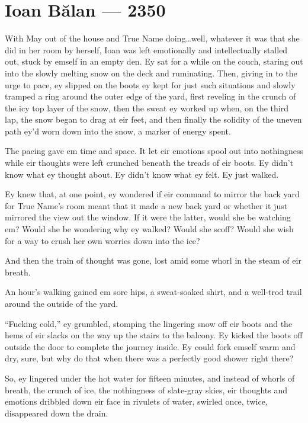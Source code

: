\hypertarget{ioan-bux103lan-2350}{%
\chapter{Ioan Bălan — 2350}\label{ioan-bux103lan-2350}}

With May out of the house and True Name doing\ldots well, whatever it was that she did in her room by herself, Ioan was left emotionally and intellectually stalled out, stuck by emself in an empty den. Ey sat for a while on the couch, staring out into the slowly melting snow on the deck and ruminating. Then, giving in to the urge to pace, ey slipped on the boots ey kept for just such situations and slowly tramped a ring around the outer edge of the yard, first reveling in the crunch of the icy top layer of the snow, then the sweat ey worked up when, on the third lap, the snow began to drag at eir feet, and then finally the solidity of the uneven path ey'd worn down into the snow, a marker of energy spent.

The pacing gave em time and space. It let eir emotions spool out into nothingness while eir thoughts were left crunched beneath the treads of eir boots. Ey didn't know what ey thought about. Ey didn't know what ey felt. Ey just walked.

Ey knew that, at one point, ey wondered if eir command to mirror the back yard for True Name's room meant that it made a new back yard or whether it just mirrored the view out the window. If it were the latter, would she be watching em? Would she be wondering why ey walked? Would she scoff? Would she wish for a way to crush her own worries down into the ice?

And then the train of thought was gone, lost amid some whorl in the steam of eir breath.

An hour's walking gained em sore hips, a sweat-soaked shirt, and a well-trod trail around the outside of the yard.

``Fucking cold,'' ey grumbled, stomping the lingering snow off eir boots and the hems of eir slacks on the way up the stairs to the balcony. Ey kicked the boots off outside the door to complete the journey inside. Ey could fork emself warm and dry, sure, but why do that when there was a perfectly good shower right there?

So, ey lingered under the hot water for fifteen minutes, and instead of whorls of breath, the crunch of ice, the nothingness of slate-gray skies, eir thoughts and emotions dribbled down eir face in rivulets of water, swirled once, twice, disappeared down the drain.

